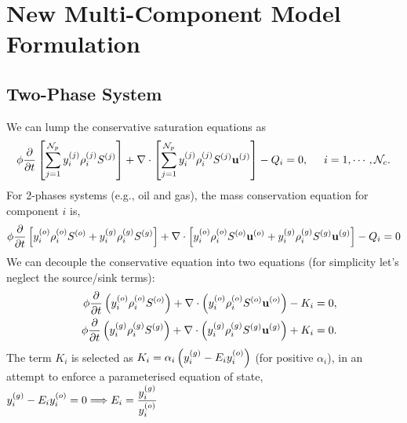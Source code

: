 \section{New Multi-Component Model Formulation}\label{Chapter:CompositionalModel:Section:MultiComponentFormulation}

\subsection{Two-Phase System}\label{Chapter:CompositionalModel:Section:MultiComponentFormulation:Section:2PhaseSystem}

We can lump the conservative saturation equations as
    \begin{equation}
              \phi \displaystyle\frac{\partial}{\partial t}\left[\summation_{j=1}^{{\cal N}_p}\mfr[y]{i}{j}\mfr[\rho]{i}{j}\mfr[S]{}{j}\right] + \nabla\cdot\left[\summation_{j=1}^{{\cal N}_p}\mfr[y]{i}{j}\mfr[\rho]{i}{j}\mfr[S]{}{j}\mfr[\mathbf{u}]{}{j}\right] - Q_{i} = 0, \hspace{.5cm} i = 1, \cdots, \mathcal{N}_{c}. \label{saturation_compositional_4}
    \end{equation} 
For 2-phases systems (e.g., oil and gas), the mass conservation equation for component $i$ is,  
     \begin{displaymath}
             \phi \displaystyle\frac{\partial}{\partial t}\left[\mfr[y]{i}{o}\mfr[\rho]{i}{o}\mfr[S]{}{o} +  \mfr[y]{i}{g}\mfr[\rho]{i}{g}\mfr[S]{}{g}\right] + \nabla\cdot\left[\mfr[y]{i}{o} \mfr[\rho]{i}{o}\mfr[S]{}{o}\mfr[\mathbf{u}]{}{o} + \mfr[y]{i}{g}\mfr[\rho]{i}{g}\mfr[S]{}{g}\mfr[\mathbf{u}]{}{g} \right] - Q_{i} = 0
    \end{displaymath}
We can decouple the conservative equation into two equations (for simplicity let's neglect the source/sink terms): 
          \begin{eqnarray}
             && \phi \displaystyle\frac{\partial}{\partial t}\left(\mfr[y]{i}{o}\mfr[\rho]{i}{o}\mfr[S]{}{o} \right) + \nabla\cdot\left(\mfr[y]{i}{o}\mfr[\rho]{i}{o}\mfr[S]{}{o}\mfr[\mathbf{u}]{}{o}  \right) - K_{i}  = 0, \nonumber \\
             && \phi \displaystyle\frac{\partial}{\partial t}\left(\mfr[y]{i}{g}\mfr[\rho]{i}{g}\mfr[S]{}{g}  \right) + \nabla\cdot\left(\mfr[y]{i}{g}\mfr[\rho]{i}{g}\mfr[S]{}{g}\mfr[\mathbf{u}]{}{g} \right) + K_{i} = 0.  \nonumber
          \end{eqnarray}
The term $K_{i}$ is selected as $K_{i}=\alpha_i \left(\mfr[y]{i}{g} - E_{i} \mfr[y]{i}{o}\right)$ (for positive $\alpha_{i}$), in an attempt to enforce a parameterised equation of state, $\mfr[y]{i}{g} - E_{i} \mfr[y]{i}{o}=0 \Longrightarrow E_{i}=\frc{\mfr[y]{i}{g}}{\mfr[y]{i}{o}}$
